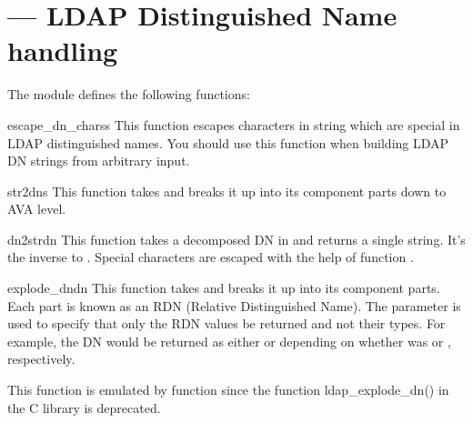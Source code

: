 
\section{ ---
  LDAP Distinguished Name handling }




\begin{seealso}
\end{seealso}

The  module defines the following functions:

\begin{funcdesc}{escape_dn_chars}{s} %
  This function escapes characters in string  which
  are special in LDAP distinguished names. You should use
  this function when building LDAP DN strings from arbitrary input.
\end{funcdesc}

\begin{funcdesc}{str2dn}{s} %
  This function takes  and breaks it up into its component parts
  down to AVA level.
\end{funcdesc}


\begin{funcdesc}{dn2str}{dn} %
  This function takes a decomposed DN in  and returns
  a single string. It's the inverse to .
  Special characters are escaped with the help of
  function .
\end{funcdesc}


\begin{funcdesc}{explode_dn}{dn } %
  This function takes  and breaks it up into its component parts. 
  Each part is known as an RDN (Relative Distinguished Name). The
   parameter is used to specify that only the RDN values be 
  returned and not their types.
  For example, the DN  would be
  returned as either \code{["cn=Bob", "c=US"]} or \code{["Bob","US"]}
  depending on whether  was  or ,
  respectively.

  This function is emulated by function 
  since the function ldap_explode_dn() in the C library is deprecated.
\end{funcdesc}

